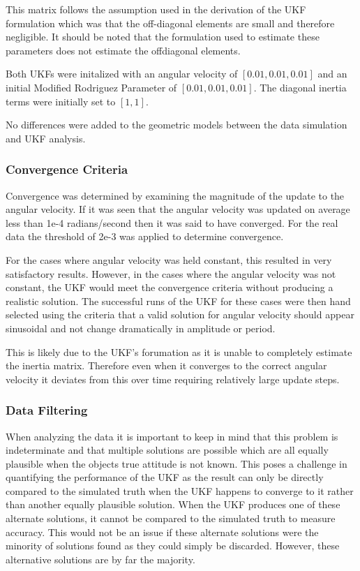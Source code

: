 This matrix follows the assumption used in the derivation of the UKF formulation which was that the off-diagonal elements are small and therefore negligible. It should be noted that the formulation used to estimate these parameters does not estimate the offdiagonal elements.

Both UKFs were initalized with an angular velocity of $[0.01, 0.01, 0.01]$ and an initial Modified Rodriguez Parameter of $[0.01, 0.01, 0.01]$. The diagonal inertia terms were initially set to $[1, 1]$.

No differences were added to the geometric models between the data simulation and UKF analysis.

\subsubsection{Convergence Criteria}

Convergence was determined by examining the magnitude of the update to the angular velocity. If it was seen that the angular velocity was updated on average less than 1e-4 radians/second then it was said to have converged. For the real data the threshold of 2e-3 was applied to determine convergence.

For the cases where angular velocity was held constant, this resulted in very satisfactory results. However, in the cases where the angular velocity was not constant, the UKF would meet the convergence criteria without producing a realistic solution. The successful runs of the UKF for these cases were then hand selected using the criteria that a valid solution for angular velocity should appear sinusoidal and not change dramatically in amplitude or period.

This is likely due to the UKF's forumation as it is unable to completely estimate the inertia matrix. Therefore even when it converges to the correct angular velocity it deviates from this over time requiring relatively large update steps.

\subsubsection{Data Filtering}

When analyzing the data it is important to keep in mind that this problem is indeterminate and that multiple solutions are possible which are all equally plausible when the objects true attitude is not known. This poses a challenge in quantifying the performance of the UKF as the result can only be directly compared to the simulated truth when the UKF happens to converge to it rather than another equally plausible solution. When the UKF produces one of these alternate solutions, it cannot be compared to the simulated truth to measure accuracy. This would not be an issue if these alternate solutions were the minority of solutions found as they could simply be discarded. However, these alternative solutions are by far the majority.

